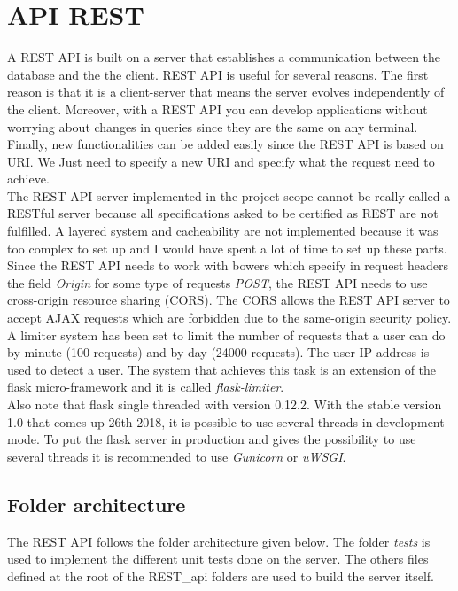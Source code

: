 \section{API REST}
A REST API is built on a server that establishes a communication between the database and the the client. REST API is useful for several reasons. The first reason is that it is a client-server that means the server evolves independently of the client. Moreover, with a REST API you can develop applications without worrying about changes in queries since they are the same on any terminal. Finally, new functionalities can be added easily since the REST API is based on URI. We Just need to specify a new URI and specify what the request need to achieve.\\

The REST API server implemented in the project scope cannot be really called a RESTful server because all specifications asked to be certified as REST are not fulfilled. A layered system and cacheability are not implemented because it was too complex to set up and I would have spent a lot of time to set up these parts.\\

Since the REST API needs to work with bowers which specify in request headers the field \textit{Origin} for some type of requests \textit{POST}, the REST API needs to use cross-origin resource sharing (CORS). The CORS allows the REST API server to accept AJAX requests which are forbidden due to the same-origin security policy.\\

A limiter system has been set to limit the number of requests that a user can do by minute (100 requests) and by day (24000 requests). The user IP address is used to detect a user. The system that achieves this task is an extension of the flask micro-framework and it is called \textit{flask-limiter}.\\

Also note that flask single threaded with version 0.12.2. With the stable version 1.0 that comes up 26th 2018, it is possible to use several threads in development mode. To put the flask server in production and gives the possibility to use several threads it is recommended to use \textit{Gunicorn} or \textit{uWSGI}.
\subsection{Folder architecture}
The REST API follows the folder architecture given below. The folder \textit{tests} is used to implement the different unit tests done on the server. The others files defined at the root of the REST\_api folders are used to build the server itself.

